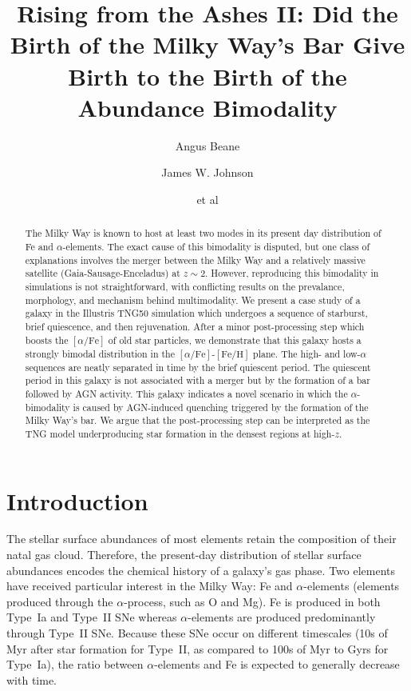 \documentclass[linenumbers, twocolumn]{aastex631}
\newcommand{\FeH}{\ensuremath{[\textrm{Fe}/\textrm{H}]}}
\newcommand{\alphaFe}{\ensuremath{[\alpha/\textrm{Fe}]}}
\begin{document}
\title{Rising from the Ashes II: Did the Birth of the Milky Way's Bar Give Birth to the Birth of the Abundance Bimodality}

\author{Angus Beane}

\author{James W. Johnson}

\author{et al}

\begin{abstract}
    The Milky Way is known to host at least two modes in its present day distribution of Fe and $\alpha$-elements. The exact cause of this bimodality is disputed, but one class of explanations involves the merger between the Milky Way and a relatively massive satellite (Gaia-Sausage-Enceladus) at $z\sim2$. However, reproducing this bimodality in simulations is not straightforward, with conflicting results on the prevalance, morphology, and mechanism behind multimodality. We present a case study of a galaxy in the Illustris TNG50 simulation which undergoes a sequence of starburst, brief quiescence, and then rejuvenation. After a minor post-processing step which boosts the \alphaFe{} of old star particles, we demonstrate that this galaxy hosts a strongly bimodal distribution in the \alphaFe{}-\FeH{} plane. The high- and low-$\alpha$ sequences are neatly separated in time by the brief quiescent period. The quiescent period in this galaxy is not associated with a merger but by the formation of a bar followed by AGN activity. This galaxy indicates a novel scenario in which the $\alpha$-bimodality is caused by AGN-induced quenching triggered by the formation of the Milky Way's bar. We argue that the post-processing step can be interpreted as the TNG model underproducing star formation in the densest regions at high-$z$.
  \end{abstract}
    
  

\section{Introduction}\label{sec:intro}
The stellar surface abundances of most elements retain the composition of their natal gas cloud. Therefore, the present-day distribution of stellar surface abundances encodes the chemical history of a galaxy's gas phase. Two elements have received particular interest in the Milky Way: Fe and $\alpha$-elements (elements produced through the $\alpha$-process, such as O and Mg). Fe is produced in both Type~Ia and Type~II SNe whereas $\alpha$-elements are produced predominantly through Type~II SNe. Because these SNe occur on different timescales (10s of Myr after star formation for Type~II, as compared to 100s of Myr to Gyrs for Type~Ia), the ratio between $\alpha$-elements and Fe is expected to generally decrease with time.
\end{document}
